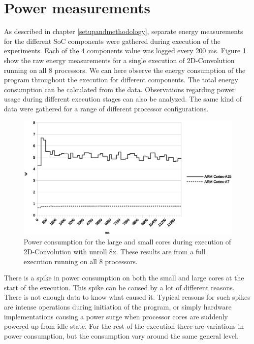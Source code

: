 \section{Power measurements}
As described in chapter \ref{setupandmethodology}, separate energy measurements for the different SoC components were gathered during execution of the experiments.
Each of the 4 components value was logged every 200 ms.
Figure \ref{powerovertime} show the raw energy measurements for a single execution of 2D-Convolution running on all 8 processors.
We can here observe the energy consumption of the program throughout the execution for different components.
The total energy consumption can be calculated from the data.
Observations regarding power usage during different execution stages can also be analyzed.
The same kind of data were gathered for a range of different processor configurations.

\begin{figure}[H]
  \centering
  \includegraphics[width=160mm]{fig/power-over-time.eps}
  \caption{Power consumption for the large and small cores during execution of 2D-Convolution with unroll 8x. These results are from a full execution running on all 8 processors. \label{overflow}}\label{powerovertime}
\end{figure}
There is a spike in power consumption on both the small and large cores at the start of the execution.
This spike can be caused by a lot of different reasons.
There is not enough data to know what caused it.
Typical reasons for such spikes are intense operations during initiation of the program, or simply hardware implementations causing a power surge when processor cores are suddenly powered up from idle state.
For the rest of the execution there are variations in power consumption, but the consumption vary around the same general level.

